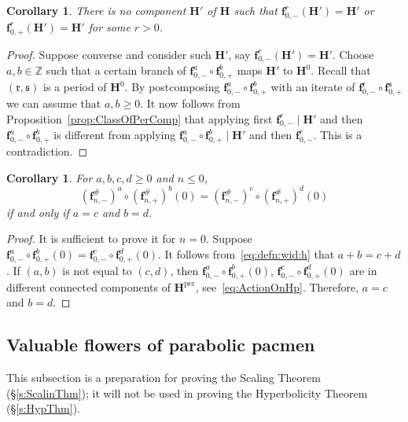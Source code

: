 \documentclass[]{amsart}
\newcommand{\bH}{{\mathbf H}}
\newcommand{\bbf}{{\mathbf f}}
\newcommand{\rr}{\mathfrak{r}}
\renewcommand{\ss}{\mathfrak{s}}
\newcommand{\Z}{\mathbb{Z}}
\newtheorem{cor}[thm]{Corollary}
\theoremstyle{remark}
\numberwithin{equation}{section}
\theoremstyle{definition}
\newcommand{\per}{{\mathrm{per}}}
\begin{document}
\begin{cor}
\label{cor:no ghost per comp}
There is no component $\bH'$ of $\bH$ such that $\bbf^r_{0,-}(\bH') =\bH'$ or $\bbf^r_{0,+}(\bH') =\bH'$ for some $r>0$.
\end{cor}

\begin{proof}
Suppose converse and consider such $\bH'$, say $\bbf^r_{0,-}(\bH') =\bH'$. Choose $a,b\in \Z$ such that a certain branch of $\bbf_{0,-}^{a}\circ \bbf_{0,+}^{b}$ maps $\bH'$  to $\bH^0$. Recall that $(\rr,\ss)$ is a period of $\bH^0$. By postcomposing 
 $\bbf_{0,-}^{a}\circ \bbf_{0,+}^{b}$ with an iterate of $\bbf_{0,-}^{\rr }\circ \bbf_{0,+}^{\ss }$ we can assume that $a,b\ge0$. It now follows from Proposition~\ref{prop:ClassOfPerComp} that applying first $ \bbf^r_{0,-}\mid \bH'$ and then $\bbf_{0,-}^{a}\circ \bbf_{0,+}^{b}$ is different from applying $\bbf_{0,-}^{a}\circ \bbf_{0,+}^{b}\mid \bH'$ and then $\bbf^r_{0,-}$. This is a contradiction.
\end{proof}


\begin{cor} 
\label{cor:contr of 0 orb}
For $a,b,c,d\ge 0$ and $n\le 0$,
\[\left(\bbf_{n,-}^\#\right)^a\circ \left(\bbf_{n,+}^\#\right)^b(0)=\left( \bbf_{n,-}^\#\right)^c\circ \left(\bbf_{n,+}^\#\right)^d(0)\]
if and only if $a=c$ and $b=d$.
 \end{cor}
\begin{proof}
It is sufficient to prove it for $n=0$. Suppose $\bbf_{0,-}^a\circ\bbf_{0,+}^b(0)=\bbf_{0,-}^c\circ\bbf_{0,+}^d(0)$. It follows from~\eqref{eq:defn:wid:h} that $a+b=c+d$. If $(a,b)$ is not equal to $(c,d)$, then $\bbf_{0,-}^a\circ\bbf_{0,+}^b(0)$, $\bbf_{0,-}^c\circ\bbf_{0,+}^d(0)$ are in different connected components of $\bH^\per$, see~\eqref{eq:ActionOnHp}. Therefore, $a=c$ and $b=d$. 
\end{proof}



\subsection{Valuable flowers of parabolic pacmen}
\label{ss:ValFlower}
This subsection is a preparation for proving the Scaling Theorem (\S\ref{s:ScalinThm}); it will not be used in proving the Hyperbolicity Theorem (\S\ref{s:HypThm}).
\end{document}
